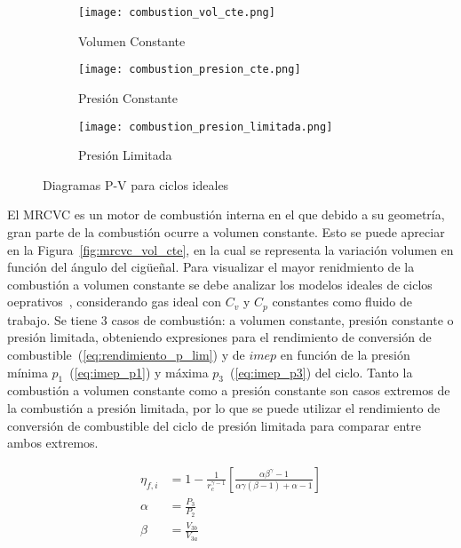 \begin{figure}[ht]
  \centering
  \begin{subfigure}{0.3\textwidth}
    \centering
    \texttt{[image: combustion\_vol\_cte.png]}
    \caption{Volumen Constante}\label{fig:comb_vcte}
  \end{subfigure}%
  \begin{subfigure}{0.3\textwidth}
    \centering
    \texttt{[image: combustion\_presion\_cte.png]}
    \caption{Presión Constante}\label{fig:comb_pcte}
  \end{subfigure}%
  \begin{subfigure}{0.3\textwidth}
    \centering
    \texttt{[image: combustion\_presion\_limitada.png]}
    \caption{Presión Limitada}\label{fig:comb_plim}
  \end{subfigure}
  \caption{Diagramas P-V para ciclos ideales\parencite{heywood}}\label{fig:ciclos_ideales}
\end{figure}

El MRCVC es un motor de combustión interna en el que debido a su geometría, gran
parte de la combustión ocurre a volumen constante.
%
Esto se puede apreciar en la Figura~\ref{fig:mrcvc_vol_cte}, en la cual se
representa la variación volumen en función del ángulo del cigüeñal.
%
Para visualizar el mayor renidmiento de la combustión a volumen constante  se
debe analizar los modelos ideales de ciclos oeprativos~\parencite{heywood},
considerando gas ideal con $C_{v}$ y $C_{p}$ constantes como fluido de trabajo.
%
Se tiene 3 casos de combustión: a volumen constante, presión constante o presión
limitada, obteniendo expresiones para el rendimiento de conversión de
combustible~(\ref{eq:rendimiento_p_lim}) y de $imep$ en función de la presión
mínima $p_1$~(\ref{eq:imep_p1}) y máxima $p_3$~(\ref{eq:imep_p3}) del ciclo.
%
Tanto la combustión a volumen constante como a presión constante son casos
extremos de la combustión a presión limitada, por lo que se puede utilizar el
rendimiento de conversión de combustible del ciclo de presión limitada para
comparar entre ambos extremos.


\begin{align}
    \label{eq:rendimiento_p_lim}
  \eta_{f,i} &= 1 - \frac{1}{r_c^{\gamma - 1}} \left[ \frac{\alpha \beta^\gamma-1}{\alpha \gamma (\beta-1)+\alpha-1} \right]\\
  \alpha &= \frac{P_3}{P_2}\\ \beta &= \frac{V_{3b}}{V_{3a}}
\end{align}


